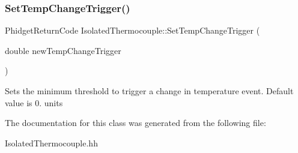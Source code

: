 \subsubsection{\texorpdfstring{Set\+Temp\+Change\+Trigger()}{SetTempChangeTrigger()}}
{\footnotesize\ttfamily Phidget\+Return\+Code Isolated\+Thermocouple\+::\+Set\+Temp\+Change\+Trigger (\begin{DoxyParamCaption}\item[{double}]{new\+Temp\+Change\+Trigger }\end{DoxyParamCaption})\hspace{0.3cm}{\ttfamily [inline]}}

Sets the minimum threshold to trigger a change in temperature event. Default value is 0. units

The documentation for this class was generated from the following file\+:\begin{DoxyCompactItemize}
\item 
Isolated\+Thermocouple.\+hh\end{DoxyCompactItemize}
